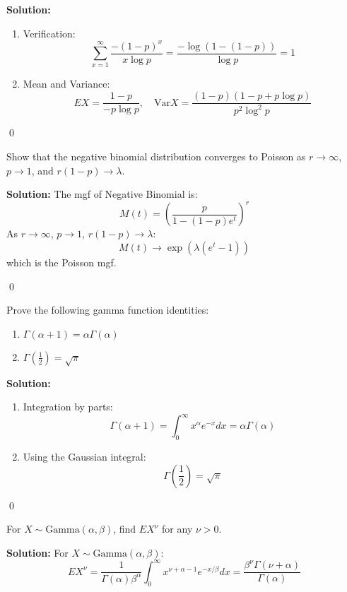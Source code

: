\noindent\textbf{Solution:}
\begin{enumerate}[label=(\alph*)]
\item Verification:
\[
\sum_{x=1}^\infty \frac{-(1-p)^x}{x\log p} = \frac{-\log(1-(1-p))}{\log p} = 1
\]

\item Mean and Variance:
\[
EX = \frac{1-p}{-p\log p}, \quad \text{Var}X = \frac{(1-p)(1-p+p\log p)}{p^2\log^2 p}
\]
\end{enumerate}


\qed
\begin{problembox}
Show that the negative binomial distribution converges to Poisson as \( r \to \infty \), \( p \to 1 \), and \( r(1-p) \to \lambda \).
\end{problembox}

\noindent\textbf{Solution:}
The mgf of Negative Binomial is:
\[
M(t) = \left(\frac{p}{1-(1-p)e^t}\right)^r
\]
As \( r \to \infty \), \( p \to 1 \), \( r(1-p) \to \lambda \):
\[
M(t) \to \exp\left(\lambda(e^t-1)\right)
\]
which is the Poisson mgf.


\qed
\begin{problembox}
Prove the following gamma function identities:
\begin{enumerate}[label=(\alph*)]
\item \( \Gamma(\alpha+1) = \alpha\Gamma(\alpha) \)
\item \( \Gamma\left(\frac{1}{2}\right) = \sqrt{\pi} \)
\end{enumerate}
\end{problembox}

\noindent\textbf{Solution:}
\begin{enumerate}[label=(\alph*)]
\item Integration by parts:
\[
\Gamma(\alpha+1) = \int_0^\infty x^\alpha e^{-x}dx = \alpha\Gamma(\alpha)
\]

\item Using the Gaussian integral:
\[
\Gamma\left(\frac{1}{2}\right) = \sqrt{\pi}
\]
\end{enumerate}


\qed
\begin{problembox}
For \( X \sim \text{Gamma}(\alpha,\beta) \), find \( EX^\nu \) for any \( \nu > 0 \).
\end{problembox}

\noindent\textbf{Solution:}
For \( X \sim \text{Gamma}(\alpha,\beta) \):
\[
EX^\nu = \frac{1}{\Gamma(\alpha)\beta^\alpha} \int_0^\infty x^{\nu+\alpha-1}e^{-x/\beta}dx = \frac{\beta^\nu\Gamma(\nu+\alpha)}{\Gamma(\alpha)}
\]



